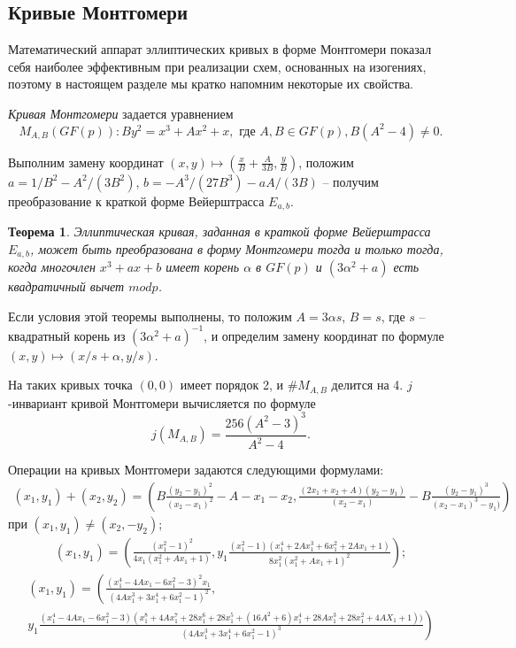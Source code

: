 \documentclass[a4paper,12pt]{article}
\newtheorem{theorem}{Теорема}
\theoremstyle{definition}
\begin{document}
\subsection{Кривые Монтгомери}
 

Математический аппарат эллиптических кривых в форме Монтгомери \cite{Mon} показал себя наиболее эффективным
при реализации схем, основанных на изогениях, поэтому в настоящем разделе мы кратко напомним некоторые их свойства.

\emph{Кривая Монтгомери} задается уравнением 
\begin{equation}\label{monty}
M_{A,B}(GF(p)): By^2=x^3+Ax^2+x, \text{ где } A,B\in GF(p), B(A^2-4)\neq 0.
\end{equation}

Выполним замену координат $(x,y)\mapsto\left(\frac{x}{B}+\frac{A}{3B},\frac{y}{B}\right)$, положим  $a=1/B^2-A^2/(3B^2)$, $b=-A^3/(27B^3)-aA/(3B)$ 
-- получим преобразование к краткой форме Вейерштрасса $E_{a,b}$.

\begin{theorem} Эллиптическая кривая, заданная в краткой форме Вейерштрасса $E_{a,b}$,
 может быть преобразована в форму Монтгомери тогда и только тогда, когда многочлен $x^3+ax+b$ 
имеет корень $\alpha$ в $GF(p)$ и $(3\alpha^2+a)$ есть квадратичный вычет $mod p$.
\end{theorem}

Если условия этой теоремы выполнены, то положим $A=3\alpha s$, $B=s$, где $s$ -- квадратный корень из $(3\alpha^2+a)^{-1}$, 
и определим замену координат по формуле $(x,y)\mapsto (x/s+\alpha,y/s)$.

На таких кривых точка $(0,0)$ имеет порядок 2, и $\#M_{A,B}$ делится на 4. $j$-инвариант кривой Монтгомери вычисляется по формуле
$$
j(M_{A,B})=\frac{256(A^2-3)^3}{A^2-4}.
$$

Операции на кривых Монтгомери задаются следующими формулами:
\small
\begin{multline*}
(x_1,y_1)+(x_2,y_2)=\left(B\frac{(y_2-y_1)^2}{(x_2-x_1)^2}-A-x_1-x_2, \frac{(2x_1+x_2+A)(y_2-y_1)}{(x_2-x_1)}-B\frac{(y_2-y_1)^3}{(x_2-x_1)^3-y_1)}\right)
\end{multline*}
при $(x_1,y_1)\neq(x_2,-y_2)$;
\begin{multline*}
[2](x_1,y_1)= \left(\frac{(x_1^2-1)^2}{4x_1(x_1^2+Ax_1+1)} , y_1\frac{(x_1^2-1)(x_1^4+2Ax_1^3+6x_1^2+2Ax_1+1)}{8x_1^2(x_1^2+Ax_1+1)^2}\right);
\end{multline*}
\begin{multline*}
[3](x_1,y_1)= \left(\frac{(x_1^4-4Ax_1-6x_1^2-3)^2x_1}{(4Ax_1^3+3x_1^4+6x_1^2-1)^2}\right., \\
\left.y_1\frac{(x_1^4-4Ax_1-6x_1^2-3)(x_1^8+4Ax_1^7+28x_1^6+28x_1^5+(16A^2+6)x_1^4+28Ax_1^3+28x_1^2+4AX_1+1))}{(4Ax_1^3+3x_1^4+6x_1^2-1)^3}\right)
\end{multline*}
\large
\end{document}
